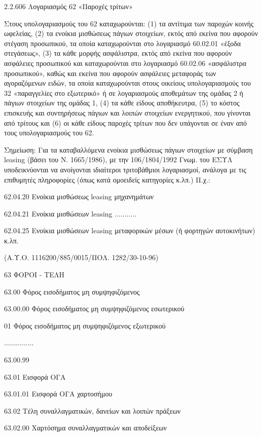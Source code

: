 \documentclass[A4,10pt,greek]{book}
\begin{document}
2.2.606 Λογαριασμός 62 «Παροχές τρίτων»

Στους υπολογαριασμούς του 62 καταχωρούνται: (1) τα αντίτιμα των παροχών κοινής ωφελείας, (2) τα ενοίκια μισθώσεως πάγιων στοιχείων, εκτός από εκείνα που αφορούν στέγαση προσωπικού, τα οποία καταχωρούνται στο λογαριασμό 60.02.01 «έξοδα στεγάσεως», (3) τα κάθε μορφής ασφάλιστρα, εκτός από εκείνα που αφορούν ασφάλειες προσωπικού και καταχωρούνται στο λογαριασμό 60.02.06 «ασφάλιστρα προσωπικού», καθώς και εκείνα που αφορούν ασφάλειες μεταφοράς των αγοραζόμενων ειδών, τα οποία καταχωρούνται στους οικείους υπολογαριασμούς του 32 «παραγγελίες στο εξωτερικό» ή σε λογαριασμούς αποθεμάτων της ομάδας 2 ή πάγιων στοιχείων της ομάδας 1, (4) τα κάθε είδους αποθήκευτρα, (5) το κόστος επισκευής και συντηρήσεως πάγιων και λοιπών στοιχείων ενεργητικού, που γίνονται από τρίτους και (6) οι κάθε είδους παροχές τρίτων που δεν υπάγονται σε έναν από τους υπολογαριασμούς του 62.


Σημείωση: Για τα καταβαλλόμενα ενοίκια μισθώσεως πάγιων στοιχείων με σύμβαση leasing (βάσει του Ν. 1665/1986), με την 106/1804/1992 Γνωμ. του ΕΣΥΛ υποδεικνύονται να ανοίγονται ιδιαίτεροι τριτοβάθμιοι λογαριασμοί, ανάλογα με τις επιθυμητές πληροφορίες (όπως κατά ομοειδείς κατηγορίες κ.λπ.) Π.χ.:

62.04.20   Ενοίκια μισθώσεως leasing μηχανημάτων

62.04.21   Ενοίκια μισθώσεων leasing ...........

62.04.25   Ενοίκια μισθώσεων leasing μεταφορικών μέσων
                  (ή φορτηγών αυτοκινήτων) κ.λπ.

 (Α.Υ.Ο. 1116200/885/0015/ΠΟΛ. 1282/30-10-96)
 
63   ΦΟΡΟΙ - ΤΕΛΗ

        63.00    Φόρος εισοδήματος μη συμψηφιζόμενος

                    63.00.00   Φόρος εισοδήματος μη συμψηφιζόμενος εσωτερικού

                              01   Φόρος εισοδήματος μη συμψηφιζόμενος εξωτερικού

                    ...............

                    63.00.99

        63.01   Εισφορά ΟΓΑ

                    63.01.01   Εισφορά ΟΓΑ χαρτοσήμου

        63.02   Τέλη συναλλαγματικών, δανείων και λοιπών πράξεων

                    63.02.00   Χαρτόσημα συναλλαγματικών και αποδείξεων
\end{document}
